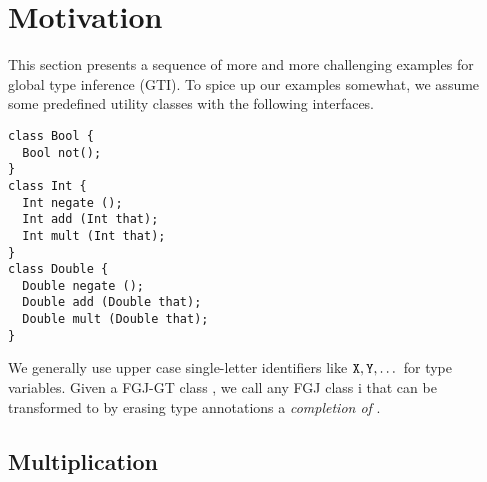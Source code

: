 \section{Motivation}
\label{sec:motivation}


This section presents a sequence of more and more challenging
examples for global type inference (GTI). To spice up our examples
somewhat, we assume some predefined utility classes with the following
interfaces.
\begin{lstlisting}[style=fgj]
class Bool {
  Bool not(); 
}
class Int {
  Int negate ();
  Int add (Int that);
  Int mult (Int that);
}
class Double {
  Double negate ();
  Double add (Double that);
  Double mult (Double that);
}
\end{lstlisting}

We generally use upper case single-letter identifiers like ${\tt X},
{\tt Y}, \dots$ for type variables.
Given a FGJ-GT class , 
we call any FGJ class \CL i that can be transformed to  by
erasing type annotations a \emph{completion of  }.

\subsection{Multiplication}
\label{sec:multiplication}

